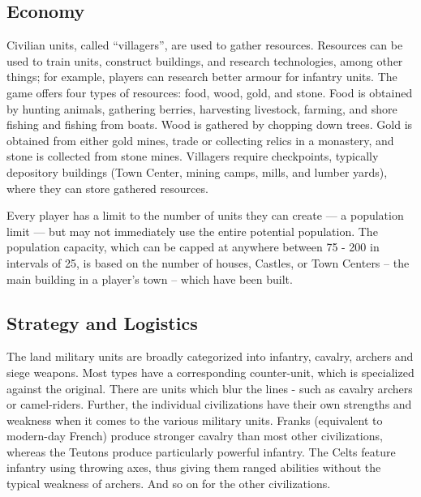 \documentclass[a4paper,12pt]{article}
\begin{document}
\subsection*{Economy}
Civilian units, called ``villagers'', are used to gather resources. 
Resources can be used to train units, construct buildings, and research 
technologies, among other things; for example, players can research 
better armour for infantry units. The game offers four types of resources: 
food, wood, gold, and stone. Food is obtained by hunting animals, 
gathering berries, harvesting livestock, farming, and shore fishing and 
fishing from boats. Wood is gathered by chopping down trees. Gold is 
obtained from either gold mines, trade or collecting relics in a 
monastery, and stone is collected from stone mines. Villagers require 
checkpoints, typically depository buildings (Town Center, mining camps, 
mills, and lumber yards), where they can store gathered resources.

Every player has a limit to the number of units they can create — a 
population limit — but may not immediately use the entire potential 
population. The population capacity, which can be capped at anywhere 
between 75 - 200 in intervals of 25, is based on the number of houses, 
Castles, or Town Centers -- the main building in a player's town -- which 
have been built.

\subsection*{Strategy and Logistics}
The land military units are broadly categorized into infantry, cavalry, 
archers and siege weapons. Most types have a corresponding counter-unit, 
which is specialized against the original. There are units which blur the 
lines - such as cavalry archers or camel-riders. Further, the individual 
civilizations have their own strengths and weakness when it comes to the
various military units. Franks (equivalent to modern-day French) produce 
stronger cavalry than most other civilizations, whereas the Teutons 
produce particularly powerful infantry. The Celts feature infantry 
using throwing axes, thus giving them ranged abilities without the typical 
weakness of archers. And so on for the other civilizations.
\end{document}
